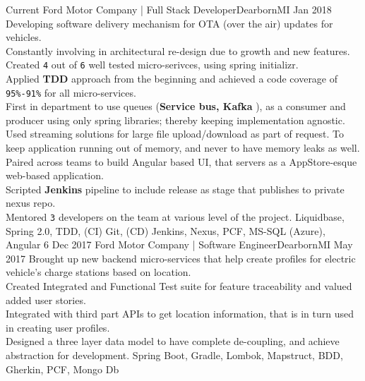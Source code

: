 \begin{experiences}
  \experience
    {Current}   
    	{Ford Motor Company | Full Stack Developer}{Dearborn}{MI} %
    {Jan 2018} {
        			\textbullet \thinspace Developing software delivery mechanism for OTA (over the air) updates for vehicles. \\
			 \textbullet \thinspace Constantly involving in architectural re-design due to growth and new features. \\
           		\textbullet \thinspace Created \texttt{4} out of \texttt{6} well tested micro-serivces, using  spring initializr. \\
           		 \textbullet \thinspace Applied \textbf{TDD} approach from the beginning and achieved a code coverage of \texttt{95\%-91\%} for all micro-services.\\
			 \textbullet \thinspace First in department to use queues (\textbf{Service bus, Kafka }), as a consumer and producer using only spring libraries; thereby keeping implementation agnostic.\\
			 \textbullet \thinspace Used streaming solutions for large file upload/download as part of request. To keep application running out of memory, and never to have memory leaks as well. \\
			 \textbullet \thinspace Paired  across teams to build Angular based UI, that servers as a AppStore-esque web-based application.\\
			\textbullet \thinspace Scripted \textbf{Jenkins} pipeline to include release as stage that publishes to private nexus repo.\\
            		 \textbullet \thinspace Mentored \texttt{3} developers on the team at various level of the project. 
		       }
			{Liquidbase, Spring 2.0, TDD, (CI) Git, (CD) Jenkins, Nexus, PCF, MS-SQL (Azure), Angular 6} %
  \emptySeparator
   \experience
    {Dec 2017}  
    	{Ford Motor Company | Software Engineer}{Dearborn}{MI} %
    {May 2017} {
                     \textbullet \thinspace	Brought up new backend micro-services that help create profiles for electric vehicle's charge stations based on location. \\
			 \textbullet \thinspace Created Integrated and Functional Test suite for feature traceability and valued added user stories. \\
			 \textbullet \thinspace Integrated with third part APIs to get location information, that is in turn used in creating user profiles. \\
			\textbullet \thinspace Designed a three layer data model to have complete de-coupling, and achieve abstraction for development. 
                       }
                    {Spring Boot, Gradle, Lombok, Mapstruct,  BDD, Gherkin,  PCF, Mongo Db} %
  \emptySeparator
  

\end{experiences}

